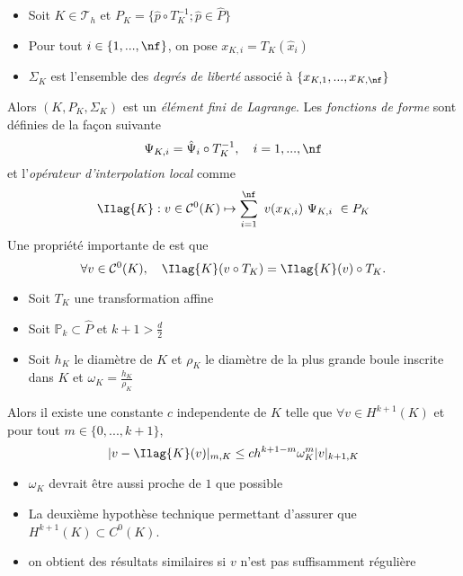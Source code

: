 \begin{proposition}
  \label{prop:6}
  \begin{itemize}
  \item Soit $K \in \mathcal{T}_h$ et $P_K=\{\hat{p} \circ T_K^{-1}; \hat{p} \in \hat{P}\}$
  \item Pour tout $i \in \{1,...,\nf\}$, on pose $x_{K,i} = T_K(\hat{x}_i)$
  \item $\Sigma_K$ est l'ensemble des \emph{degrés de liberté} associé à $\{x_{K,1},...,x_{K,\nf}\}$
  \end{itemize}
  Alors $(K,P_K,\Sigma_K)$ est un \emph{élément fini de Lagrange}.
  Les  \emph{fonctions de forme} sont définies de la fa\c {c}on suivante
  \begin{equation}
    \label{eq:49}
    \Psi_{K,i} = \hat{\Psi}_i \circ T_K^{-1}, \quad i=1,...,\nf
  \end{equation}
  et   l'\emph{opérateur d'interpolation local}  comme
    \begin{equation}
      \label{eq:50}
      \Ilag{K}: v \in \mathcal{C}^0(K) \mapsto \sum_{i=1}^\nf\ v(x_{K,i})\ \Psi_{K,i}\
      \in P_K
    \end{equation}
    Une propriété importante de  est que
    \begin{equation}
      \label{eq:51}
      \forall v \in \mathcal{C}^0(K),\quad \Ilag{K}( v \circ T_K ) =
      \Ilag{K}( v ) \circ T_K.
    \end{equation}
  \end{proposition}

  \begin{theorem}
    \label{thr:14}
    \begin{itemize}
    \item Soit $T_K$ une transformation affine
    \item Soit $\mathbb{P}_k \subset \hat{P}$ et $k+1 > \frac{d}{2}$
    \item Soit $h_K$ le diamètre de $K$ et $\rho_K$ le diamètre de la plus
      grande boule      inscrite  dans $K$ et  $\omega_K = \frac{h_K}{\rho_K}$
    \end{itemize}
    Alors il existe une constante $c$ independente de $K$ telle que $\forall v \in
    H^{k+1}(K)$ et pour tout $m \in \{0,...,k+1\}$,
    \begin{equation}
      \label{eq:32}
      |v - \Ilag{K}(v)|_{m,K} \leq  c h^{k+1-m} \omega_K^m |v|_{k+1,K}
    \end{equation}
  \end{theorem}
  \begin{remark}
    \label{rem:20}
    \begin{itemize}
    \item $\omega_K$ devrait être aussi proche de $1$ que possible
    \item La deuxième hypothèse technique permettant d'assurer que $H^{k+1}(K) \subset
      C^0(K)$.
    \item on obtient des résultats similaires si $v$ n'est pas suffisamment régulière
    \end{itemize}

  \end{remark}

